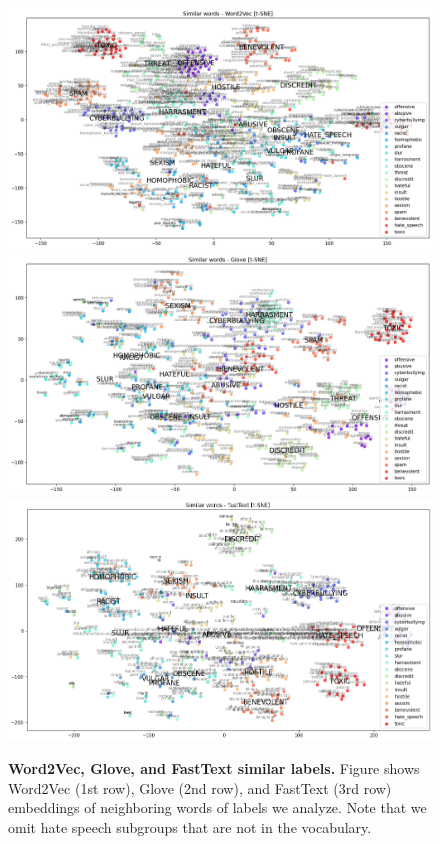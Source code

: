 \documentclass[fleqn,moreauthors,10pt]{ds_report}
\begin{document}
\begin{figure}[!t]
	\centering
	\includegraphics[width=\linewidth]{SimilarWords - word2vec - t-SNE_1.png}
	\includegraphics[width=\linewidth]{SimilarWords - Glove - t-SNE_1.png}
	\includegraphics[width=\linewidth]{SimilarWords - FastText - t-SNE_1.png}
	\caption{\textbf{Word2Vec, Glove, and FastText similar labels.} Figure shows Word2Vec (1st row), Glove (2nd row), and FastText (3rd row) embeddings of neighboring words of labels we analyze. Note that we omit hate speech subgroups that are not in the vocabulary.}
	\label{fig:embedding_labels}
\end{figure}
\end{document}

